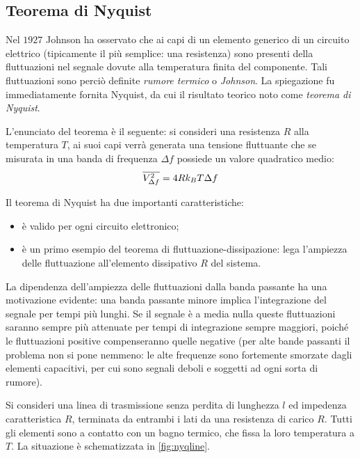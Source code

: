 \subsection{Teorema di Nyquist}
\label{sec:nyquistth}

Nel $ 1927 $ Johnson ha osservato che ai capi di un elemento generico di un circuito elettrico (tipicamente il più semplice: una resistenza) sono presenti della fluttuazioni nel segnale dovute alla temperatura finita del componente. Tali fluttuazioni sono perciò definite \textit{rumore termico} o \textit{Johnson}.
La spiegazione fu immediatamente fornita Nyquist, da cui il risultato teorico noto come \textit{teorema di Nyquist}.
\newline

L'enunciato del teorema è il seguente: si consideri una resistenza $ R $ alla temperatura $ T $, ai suoi capi verrà generata una tensione fluttuante che se misurata in una banda di frequenza $ \Delta f $ possiede un valore quadratico medio:
\[ \overline{V_{\Delta f}^2} = 4 R k_B T \Delta f \]

Il teorema di Nyquist ha due importanti caratteristiche:
\begin{itemize}
	\item è valido per ogni circuito elettronico;
	\item è un primo esempio del teorema di fluttuazione-dissipazione: lega l'ampiezza delle fluttuazione all'elemento dissipativo $ R $ del sistema.
\end{itemize}

\begin{oss}
	La dipendenza dell'ampiezza delle fluttuazioni dalla banda passante ha una motivazione evidente: una banda passante minore implica l'integrazione del segnale per tempi più lunghi. Se il segnale è a media nulla queste fluttuazioni saranno sempre più attenuate per tempi di integrazione sempre maggiori, poiché le fluttuazioni positive compenseranno quelle negative (per alte bande passanti il problema non si pone nemmeno: le alte frequenze sono fortemente smorzate dagli elementi capacitivi, per cui sono segnali deboli e soggetti ad ogni sorta di rumore).
\end{oss}

Si consideri una linea di trasmissione senza perdita di lunghezza $ l $ ed impedenza caratteristica $ R $, terminata da entrambi i lati da una resistenza di carico $ R $.
Tutti gli elementi sono a contatto con un bagno termico, che fissa la loro temperatura a $ T $. La situazione è schematizzata in \cref{fig:nyqline}.

